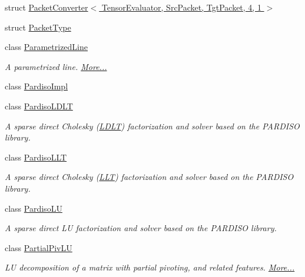 \begin{DoxyCompactItemize}
\item 
struct \hyperlink{struct_eigen_1_1_packet_converter_3_01_tensor_evaluator_00_01_src_packet_00_01_tgt_packet_00_014_00_011_01_4}{Packet\+Converter$<$ Tensor\+Evaluator, Src\+Packet, Tgt\+Packet, 4, 1 $>$}
\item 
struct \hyperlink{struct_eigen_1_1_packet_type}{Packet\+Type}
\item 
class \hyperlink{group___geometry___module_class_eigen_1_1_parametrized_line}{Parametrized\+Line}
\begin{DoxyCompactList}\small\item\em A parametrized line.  \hyperlink{group___geometry___module_class_eigen_1_1_parametrized_line}{More...}\end{DoxyCompactList}\item 
class \hyperlink{class_eigen_1_1_pardiso_impl}{Pardiso\+Impl}
\item 
class \hyperlink{class_eigen_1_1_pardiso_l_d_l_t}{Pardiso\+L\+D\+LT}
\begin{DoxyCompactList}\small\item\em A sparse direct Cholesky (\hyperlink{group___cholesky___module_class_eigen_1_1_l_d_l_t}{L\+D\+LT}) factorization and solver based on the P\+A\+R\+D\+I\+SO library. \end{DoxyCompactList}\item 
class \hyperlink{class_eigen_1_1_pardiso_l_l_t}{Pardiso\+L\+LT}
\begin{DoxyCompactList}\small\item\em A sparse direct Cholesky (\hyperlink{group___cholesky___module_class_eigen_1_1_l_l_t}{L\+LT}) factorization and solver based on the P\+A\+R\+D\+I\+SO library. \end{DoxyCompactList}\item 
class \hyperlink{class_eigen_1_1_pardiso_l_u}{Pardiso\+LU}
\begin{DoxyCompactList}\small\item\em A sparse direct LU factorization and solver based on the P\+A\+R\+D\+I\+SO library. \end{DoxyCompactList}\item 
class \hyperlink{group___l_u___module_class_eigen_1_1_partial_piv_l_u}{Partial\+Piv\+LU}
\begin{DoxyCompactList}\small\item\em LU decomposition of a matrix with partial pivoting, and related features.  \hyperlink{group___l_u___module_class_eigen_1_1_partial_piv_l_u}{More...}\end{DoxyCompactList}\item 

\end{DoxyCompactItemize}
